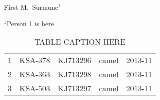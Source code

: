 \documentclass[11pt,oneside,letterpaper]{article}
\begin{document}
First M.\ Surname$^{1}$

$^{1}$Person 1 is here \\

% 
% 

\newpage


\setcounter{figure}{0}
\setcounter{table}{0}
\renewcommand{\thefigure}{S\arabic{figure}}
\renewcommand{\thetable}{S\arabic{table}}

\begin{longtable}{ | r | l | p{2cm} | l | l | } %

  \caption{TABLE CAPTION HERE} \label{TABLE LABEL HERE} \\
  \endfirsthead

  1 & KSA-378 & KJ713296 & camel & 2013-11 \\
  2 & KSA-363 & KJ713298 & camel & 2013-11 \\
  3 & KSA-503 & KJ713297 & camel & 2013-11 \\

\end{longtable}



%
%
%
\end{document}
